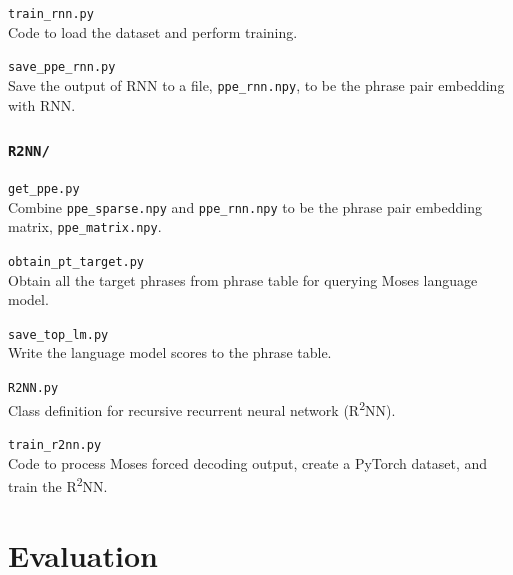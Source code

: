 \documentclass[12pt,a4paper,twoside]{report}
\begin{document}
\texttt{train\_rnn.py}\\
Code to load the dataset and perform training.

\texttt{save\_ppe\_rnn.py}\\
Save the output of RNN to a file, \texttt{ppe\_rnn.npy}, to be the phrase pair embedding with RNN.

\subsection{\texttt{R2NN/}}
\texttt{get\_ppe.py}\\
Combine \texttt{ppe\_sparse.npy} and \texttt{ppe\_rnn.npy} to be the phrase pair embedding matrix, \texttt{ppe\_matrix.npy}.

\texttt{obtain\_pt\_target.py}\\
Obtain all the target phrases from phrase table for querying Moses language model.

\texttt{save\_top\_lm.py}\\
Write the language model scores to the phrase table.

\texttt{R2NN.py}\\
Class definition for recursive recurrent neural network (R\textsuperscript{2}NN).

\texttt{train\_r2nn.py}\\
Code to process Moses forced decoding output, create a PyTorch dataset, and train the R\textsuperscript{2}NN.


\chapter{Evaluation}\label{chapter:evaluation}
\end{document}
